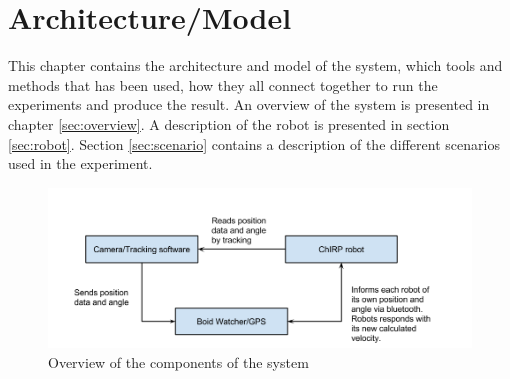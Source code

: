 \chapter{Architecture/Model}
\label{sec:architectureAndModel}
This chapter contains the architecture and model of the system, which tools and methods that has been used, how they all connect together to run the experiments and produce the result.
An overview of the system is presented in chapter \ref{sec:overview}. A description of the robot is presented in section \ref{sec:robot}. Section \ref{sec:scenario} contains a description of the different scenarios used in the experiment.

\begin{figure}[h]
\begin{center}
\includegraphics[width=\linewidth]{figs/system_overview}
\end{center}
\caption[System overview]{Overview of the components of the system}
\label{fig:overview}
\end{figure}

